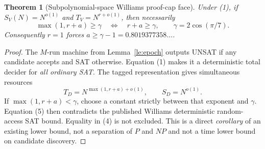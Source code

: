\documentclass[11pt]{article}
\newtheorem{theorem}{Theorem}
\begin{document}
\begin{theorem}[Subpolynomial-space Williams proof-cap face]
Under (1), if $S_V(N)=N^{o(1)}$ and $T_V=N^{r+o(1)}$,
then necessarily
\[
\boxed{\max(1,r+a)\ge\gamma}\quad\Longleftrightarrow\quad
\boxed{r+a\ge\gamma},\qquad\gamma=2\cos(\pi/7).\tag{4}
\]
Consequently $r=1$ forces $a\ge\gamma-1=0.8019377358\ldots$.
\end{theorem}
\begin{proof}
The $M$-run machine from Lemma~\ref{le:epoch} outputs UNSAT if
any candidate accepts and SAT otherwise. Equation (1)
makes it a deterministic total decider for \emph{all ordinary SAT}.
The tagged representation gives simultaneous resources
\[
T_D=N^{\max(1,r+a)+o(1)},\qquad S_D=N^{o(1)}.\tag{5}
\]
If $\max(1,r+a)<\gamma$, choose a constant strictly between
that exponent and $\gamma$. Equation (5) then contradicts the
published Williams deterministic random-access SAT bound.
Equality in (4) is not excluded. This is a direct
\emph{corollary} of an existing lower bound, not a separation
of $P$ and $NP$ and not a time lower bound on candidate discovery.
\end{proof}
\end{document}
